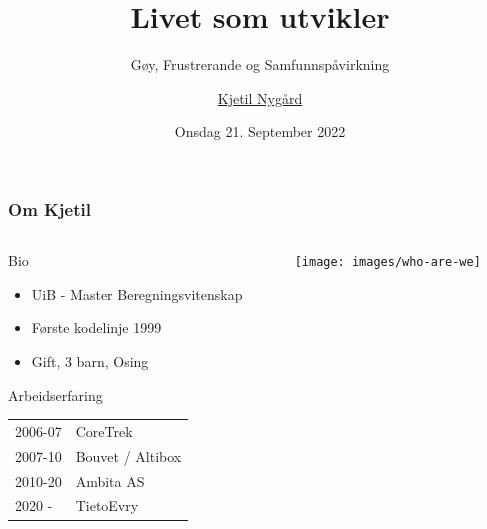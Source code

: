 \documentclass{beamer}
\title{Livet som utvikler}
\subtitle{Gøy, Frustrerande og Samfunnspåvirkning}
\author{\href{kjetil.nygard@tietoevry.com}{Kjetil Nygård}}
\institute{TietoEvry}
\date{Onsdag 21. September 2022}
\begin{document}
    \frame{\titlepage}


    \begin{frame}
        \frametitle{Om Kjetil}
        \begin{columns}[c]
            \begin{column}{.55\textwidth}
                \begin{block}{Bio}
                    \begin{itemize}
                        \item UiB - Master Beregningsvitenskap
                        \item Første kodelinje 1999
                        \item Gift, 3 barn, Osing
                    \end{itemize}
                \end{block}
                \begin{block}{Arbeidserfaring}
                    \begin{tabular}{ll}
                        2006-07 & CoreTrek         \\
                        2007-10 & Bouvet / Altibox \\
                        2010-20 & Ambita AS        \\
                        2020 -  & TietoEvry
                    \end{tabular}
                \end{block}
            \end{column}
            \begin{column}{.45\textwidth}
                \begin{center}
                    \texttt{[image: images/who-are-we]}
                \end{center}
            \end{column}
        \end{columns}
    \end{frame}
\end{document}
